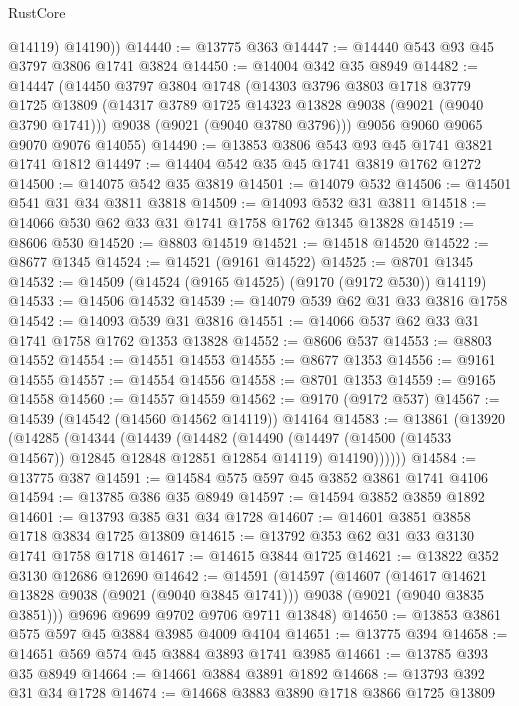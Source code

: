 \begin{lexlean}{RustCore}
\begin{coremodule}
          @14119)
        @14190))
@14440 := @13775 @363
@14447 := @14440 @543 @93 @45 @3797 @3806 @1741 @3824
@14450 := @14004 @342 @35 @8949
@14482 := @14447
    (@14450
      @3797
      @3804
      @1748
      (@14303
        @3796
        @3803
        @1718
        @3779
        @1725
        @13809
        (@14317 @3789 @1725 @14323 @13828 @9038 (@9021 (@9040 @3790 @1741)))
        @9038
        (@9021 (@9040 @3780 @3796)))
      @9056
      @9060
      @9065
      @9070
      @9076
      @14055)
@14490 := @13853 @3806 @543 @93 @45 @1741 @3821 @1741 @1812
@14497 := @14404 @542 @35 @45 @1741 @3819 @1762 @1272
@14500 := @14075 @542 @35 @3819
@14501 := @14079 @532
@14506 := @14501 @541 @31 @34 @3811 @3818
@14509 := @14093 @532 @31 @3811
@14518 := @14066 @530 @62 @33 @31 @1741 @1758 @1762 @1345 @13828
@14519 := @8606 @530
@14520 := @8803 @14519
@14521 := @14518 @14520
@14522 := @8677 @1345
@14524 := @14521 (@9161 @14522)
@14525 := @8701 @1345
@14532 := @14509 (@14524 (@9165 @14525) (@9170 (@9172 @530)) @14119)
@14533 := @14506 @14532
@14539 := @14079 @539 @62 @31 @33 @3816 @1758
@14542 := @14093 @539 @31 @3816
@14551 := @14066 @537 @62 @33 @31 @1741 @1758 @1762 @1353 @13828
@14552 := @8606 @537
@14553 := @8803 @14552
@14554 := @14551 @14553
@14555 := @8677 @1353
@14556 := @9161 @14555
@14557 := @14554 @14556
@14558 := @8701 @1353
@14559 := @9165 @14558
@14560 := @14557 @14559
@14562 := @9170 (@9172 @537)
@14567 := @14539 (@14542 (@14560 @14562 @14119)) @14164
@14583 := @13861
    (@13920
      (@14285
        (@14344
          (@14439
            (@14482
              (@14490
                (@14497 (@14500 (@14533 @14567)) @12845 @12848 @12851 @12854 @14119)
                @14190))))))
@14584 := @13775 @387
@14591 := @14584 @575 @597 @45 @3852 @3861 @1741 @4106
@14594 := @13785 @386 @35 @8949
@14597 := @14594 @3852 @3859 @1892
@14601 := @13793 @385 @31 @34 @1728
@14607 := @14601 @3851 @3858 @1718 @3834 @1725 @13809
@14615 := @13792 @353 @62 @31 @33 @3130 @1741 @1758 @1718
@14617 := @14615 @3844 @1725
@14621 := @13822 @352 @3130 @12686 @12690
@14642 := @14591
    (@14597
      (@14607
        (@14617 @14621 @13828 @9038 (@9021 (@9040 @3845 @1741)))
        @9038
        (@9021 (@9040 @3835 @3851)))
      @9696
      @9699
      @9702
      @9706
      @9711
      @13848)
@14650 := @13853 @3861 @575 @597 @45 @3884 @3985 @4009 @4104
@14651 := @13775 @394
@14658 := @14651 @569 @574 @45 @3884 @3893 @1741 @3985
@14661 := @13785 @393 @35 @8949
@14664 := @14661 @3884 @3891 @1892
@14668 := @13793 @392 @31 @34 @1728
@14674 := @14668 @3883 @3890 @1718 @3866 @1725 @13809

\end{coremodule}
\end{lexlean}
